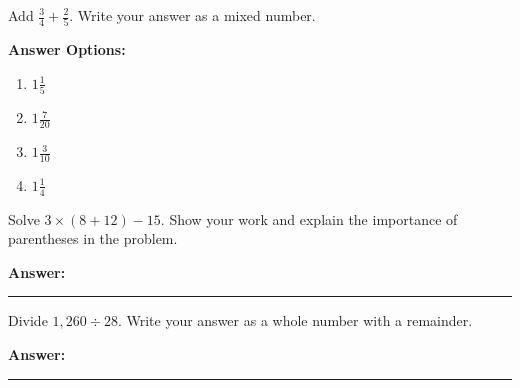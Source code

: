 \documentclass[12pt]{article}
\begin{document}
\begin{tcolorbox}[colframe=black!50, colback=white, title=\textbf{Problem 8 (5.NF.A.1)}]
Add \( \frac{3}{4} + \frac{2}{5} \). Write your answer as a mixed number.

\textbf{Answer Options:}
\begin{enumerate}[label=(\Alph*), itemsep=0.5cm]
    \item \(1\frac{1}{5}\)
    \item \(1\frac{7}{20}\)
    \item \(1\frac{3}{10}\)
    \item \(1\frac{1}{4}\)
\end{enumerate}

\vspace{.25cm}
\end{tcolorbox}










\begin{tcolorbox}[colframe=black!50, colback=white, title=\textbf{Problem 9 (5.NBT.A.3)}]
Solve \(3 \times (8 + 12) - 15\). Show your work and explain the importance of parentheses in the problem.

\vspace{3cm}
\textbf{Answer:} \rule{0.5\textwidth}{0.4mm}
\end{tcolorbox}

\begin{tcolorbox}[colframe=black!50, colback=white, title=\textbf{Problem 10 (5.NBT.6)}]
Divide \(1,260 \div 28\). Write your answer as a whole number with a remainder.

\vspace{3cm}
\textbf{Answer:} \rule{0.5\textwidth}{0.4mm}
\end{tcolorbox}
\end{document}
